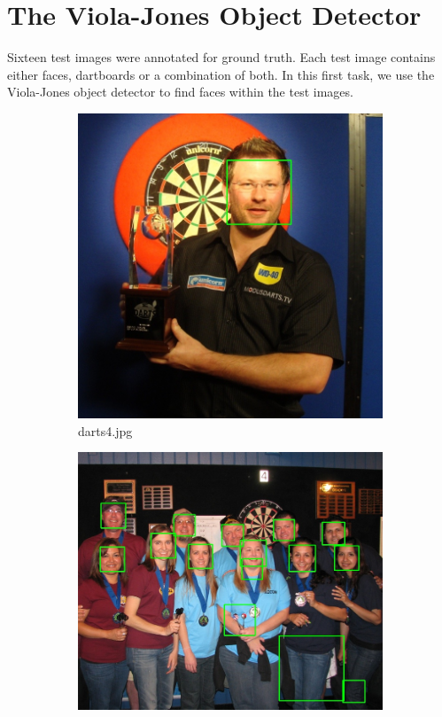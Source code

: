 \documentclass[conference]{IEEEtran}
\begin{document}
\section{The Viola-Jones Object Detector}
Sixteen test images were annotated for ground truth. Each test image contains either faces, dartboards or a combination of both. In this first task, we use the Viola-Jones object detector to find faces within the test images. 
\begin{figure}[htb]
\centering
\begin{subfigure}{.5\linewidth}
  \centering
  \includegraphics[width=.9\linewidth]{images/detected0.jpg}
  \caption{darts4.jpg}
  \label{fig:sub1}
\end{subfigure}%
\begin{subfigure}{.5\linewidth}
  \centering
  \includegraphics[width=.9\linewidth]{images/detected1.jpg}

\end{subfigure}
\end{figure}
\end{document}
